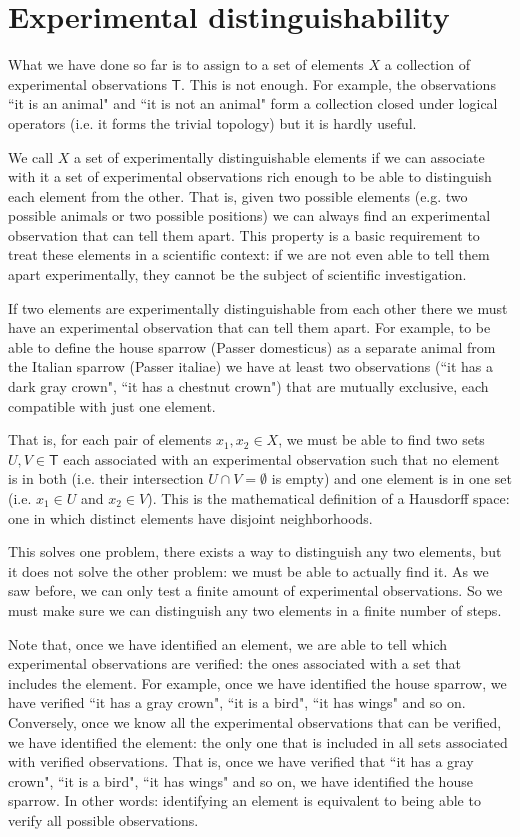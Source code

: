 \documentclass[11pt,letterpaper,fleqn]{memoir} %
\begin{document}
\section{Experimental distinguishability}

What we have done so far is to assign to a set of elements $X$ a collection of experimental observations $\mathsf{T}$. This is not enough. For example, the observations ``it is an animal" and ``it is not an animal" form a collection closed under logical operators (i.e. it forms the trivial topology) but it is hardly useful.

We call $X$ a set of experimentally distinguishable elements if we can associate with it a set of experimental observations rich enough to be able to distinguish each element from the other. That is, given two possible elements (e.g. two possible animals or two possible positions) we can always find an experimental observation that can tell them apart. This property is a basic requirement to treat these elements in a scientific context: if we are not even able to tell them apart experimentally, they cannot be the subject of scientific investigation.

If two elements are experimentally distinguishable from each other there we must have an experimental observation that can tell them apart. For example, to be able to define the house sparrow (Passer domesticus) as a separate animal from the Italian sparrow (Passer italiae) we have at least two observations (``it has a dark gray crown", ``it has a chestnut crown") that are mutually exclusive, each compatible with just one element.

That is, for each pair of elements $x_1, x_2 \in X$, we must be able to find two sets $U,V \in \mathsf{T}$ each associated with an experimental observation such that no element is in both (i.e. their intersection $U \cap V=\emptyset$ is empty) and one element is in one set (i.e. $x_1 \in U$ and $x_2 \in V$). This is the mathematical definition of a Hausdorff space: one in which distinct elements have disjoint neighborhoods. 

This solves one problem, there exists a way to distinguish any two elements, but it does not solve the other problem: we must be able to actually find it. As we saw before, we can only test a finite amount of experimental observations. So we must make sure we can distinguish any two elements in a finite number of steps.

Note that, once we have identified an element, we are able to tell which experimental observations are verified: the ones associated with a set that includes the element. For example, once we have identified the house sparrow, we have verified ``it has a gray crown", ``it is a bird", ``it has wings" and so on. Conversely, once we know all the experimental observations that can be verified, we have identified the element: the only one that is included in all sets associated with verified observations. That is, once we have verified that ``it has a gray crown", ``it is a bird", ``it has wings" and so on, we have identified the house sparrow. In other words: identifying an element is equivalent to being able to verify all possible observations.
\end{document}
